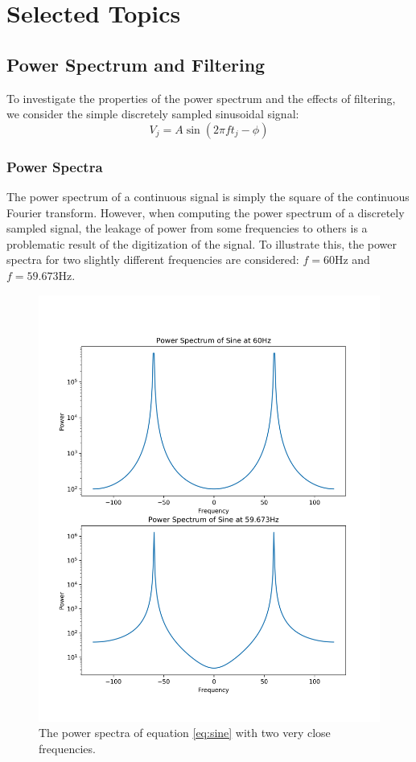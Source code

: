 \documentclass[11pt, letterpage]{article}
\begin{document}
\section{Selected Topics}
\subsection{Power Spectrum and Filtering}
To investigate the properties of the power spectrum and the effects of
filtering, we consider the simple discretely sampled sinusoidal signal:
\begin{equation}
  V_j = A \sin(2 \pi f t_j - \phi)
  \label{eq:sine}
\end{equation}


\subsubsection{Power Spectra}
The power spectrum of a continuous signal is simply the square of the continuous
Fourier transform. However, when computing the power spectrum of a discretely
sampled signal, the leakage of power from some frequencies to others is a
problematic result of the digitization of the signal. To illustrate this, the
power spectra for two slightly different frequencies are considered: $f = 60$Hz
and $f = 59.673$Hz.

\begin{figure}
  \includegraphics[width=\linewidth]{power_spectrum.png}
  \caption{
    The power spectra of equation \ref{eq:sine} with two very close frequencies.
  }
  \label{}
\end{figure}
\end{document}
